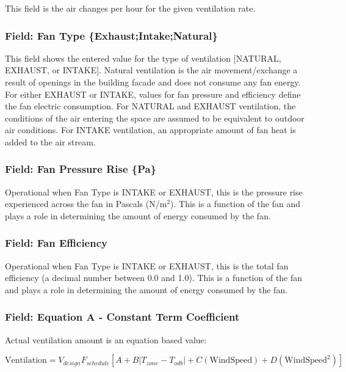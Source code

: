 This field is the air changes per hour for the given ventilation rate.

\subsubsection{Field: Fan Type \{Exhaust;Intake;Natural\}}\label{field-fan-type-exhaustintakenatural}

This field shows the entered value for the type of ventilation {[}NATURAL, EXHAUST, or INTAKE{]}. Natural ventilation is the air movement/exchange a result of openings in the building facade and does not consume any fan energy. For either EXHAUST or INTAKE, values for fan pressure and efficiency define the fan electric consumption. For NATURAL and EXHAUST ventilation, the conditions of the air entering the space are assumed to be equivalent to outdoor air conditions. For INTAKE ventilation, an appropriate amount of fan heat is added to the air stream.

\subsubsection{Field: Fan Pressure Rise \{Pa\}}\label{field-fan-pressure-rise-pa}

Operational when Fan Type is INTAKE or EXHAUST, this is the pressure rise experienced across the fan in Pascals (N/m\(^{2}\)). This is a function of the fan and plays a role in determining the amount of energy consumed by the fan.

\subsubsection{Field: Fan Efficiency}\label{field-fan-efficiency}

Operational when Fan Type is INTAKE or EXHAUST, this is the total fan efficiency (a decimal number between 0.0 and 1.0). This is a function of the fan and plays a role in determining the amount of energy consumed by the fan.

\subsubsection{Field: Equation A - Constant Term Coefficient}\label{field-equation-a---constant-term-coefficient-1}

Actual ventilation amount is an equation based value:

\begin{equation}
\text{Ventilation} = V_{design} F_{schedule} \left[ A + B \left| T_{zone}-T_{odb} \right| + C\left(\text{WindSpeed}\right) + D\left(\text{WindSpeed}^2\right)  \right]
\end{equation}

